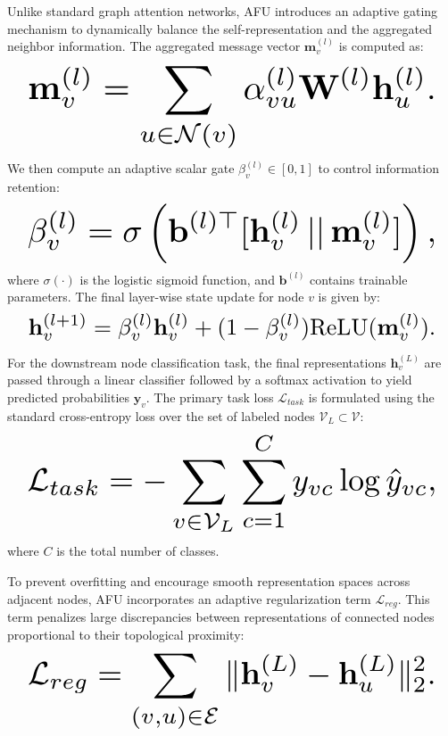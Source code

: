 \documentclass[10pt,twocolumn]{article}
\begin{document}
Unlike standard graph attention networks, \textsc{AFU} introduces an adaptive gating mechanism to dynamically balance the self-representation and the aggregated neighbor information. The aggregated message vector $\mathbf{m}_v^{(l)}$ is computed as:
\begin{equation}
\resizebox{0.95\columnwidth}{!}{\ensuremath{\displaystyle \mathbf{m}_v^{(l)} = \sum_{u \in \mathcal{N}(v)} \alpha_{vu}^{(l)} \mathbf{W}^{(l)}\mathbf{h}_u^{(l)}.}}
\end{equation}
We then compute an adaptive scalar gate $\beta_v^{(l)} \in [0, 1]$ to control information retention:
\begin{equation}
\resizebox{0.95\columnwidth}{!}{\ensuremath{\displaystyle \beta_v^{(l)} = \sigma\left(\mathbf{b}^{(l)\top} 
  [\mathbf{h}_v^{(l)} \,||\, \mathbf{m}_v^{(l)}]\right),}}
\end{equation}
where $\sigma(\cdot)$ is the logistic sigmoid function, and $\mathbf{b}^{(l)}$ contains trainable parameters. The final layer-wise state update for node $v$ is given by:
\begin{equation}
\resizebox{0.95\columnwidth}{!}{\ensuremath{\displaystyle \mathbf{h}_v^{(l+1)} = \beta_v^{(l)} \mathbf{h}_v^{(l)} + (1 - \beta_v^{(l)}) \text{ReLU}(\mathbf{m}_v^{(l)}).}}
\end{equation}

For the downstream node classification task, the final representations $\mathbf{h}_v^{(L)}$ are passed through a linear classifier followed by a softmax activation to yield predicted probabilities $\hat{\mathbf{y}}_v$. The primary task loss $\mathcal{L}_{task}$ is formulated using the standard cross-entropy loss over the set of labeled nodes $\mathcal{V}_L \subset \mathcal{V}$:
\begin{equation}
\resizebox{0.95\columnwidth}{!}{\ensuremath{\displaystyle \mathcal{L}_{task} = -\sum_{v \in \mathcal{V}_L} \sum_{c=1}^{C} y_{vc} \log \hat{y}_{vc},}}
\end{equation}
where $C$ is the total number of classes. 

To prevent overfitting and encourage smooth representation spaces across adjacent nodes, \textsc{AFU} incorporates an adaptive regularization term $\mathcal{L}_{reg}$. This term penalizes large discrepancies between representations of connected nodes proportional to their topological proximity:
\begin{equation}
\resizebox{0.95\columnwidth}{!}{\ensuremath{\displaystyle \mathcal{L}_{reg} = \sum_{(v,u) \in \mathcal{E}} 
  \|\mathbf{h}_v^{(L)} - \mathbf{h}_u^{(L)}\|_2^2.}}
\end{equation}
\end{document}
